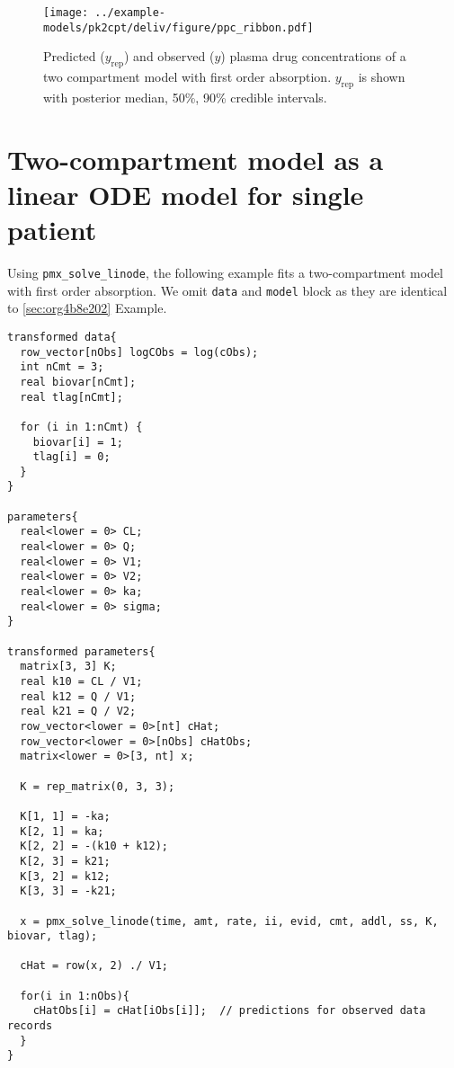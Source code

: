 \documentclass[12pt, reqno, oneside]{amsbook}
\numberwithin{equation}{chapter}
\numberwithin{figure}{chapter}
\numberwithin{table}{chapter}
\theoremstyle{remark}
\begin{document}
\begin{figure}[htbp]
\centering
\texttt{[image: ../example-models/pk2cpt/deliv/figure/ppc\_ribbon.pdf]}
\caption{\label{twocpt_mcmc_predict}Predicted (\(y_{\text{rep}}\)) and observed (\(y\)) plasma drug concentrations of a two compartment model with first order absorption. \(y_{\text{rep}}\) is shown with posterior median, 50\%, 90\% credible intervals.}
\end{figure}

\section{Two-compartment model as a linear ODE model for single patient}
\label{sec:org12943da}
Using \texttt{pmx\_solve\_linode}, the following example fits a two-compartment model
with first order absorption. We omit \texttt{data} and
\texttt{model} block as they are identical to \ref{sec:org4b8e202} Example.

\begin{verbatim}
transformed data{
  row_vector[nObs] logCObs = log(cObs);
  int nCmt = 3;
  real biovar[nCmt];
  real tlag[nCmt];

  for (i in 1:nCmt) {
    biovar[i] = 1;
    tlag[i] = 0;
  }
}

parameters{
  real<lower = 0> CL;
  real<lower = 0> Q;
  real<lower = 0> V1;
  real<lower = 0> V2;
  real<lower = 0> ka;
  real<lower = 0> sigma;
}

transformed parameters{
  matrix[3, 3] K;
  real k10 = CL / V1;
  real k12 = Q / V1;
  real k21 = Q / V2;
  row_vector<lower = 0>[nt] cHat;
  row_vector<lower = 0>[nObs] cHatObs;
  matrix<lower = 0>[3, nt] x;

  K = rep_matrix(0, 3, 3);

  K[1, 1] = -ka;
  K[2, 1] = ka;
  K[2, 2] = -(k10 + k12);
  K[2, 3] = k21;
  K[3, 2] = k12;
  K[3, 3] = -k21;

  x = pmx_solve_linode(time, amt, rate, ii, evid, cmt, addl, ss, K, biovar, tlag);

  cHat = row(x, 2) ./ V1;

  for(i in 1:nObs){
    cHatObs[i] = cHat[iObs[i]];  // predictions for observed data records
  }
}
\end{verbatim}
\end{document}
